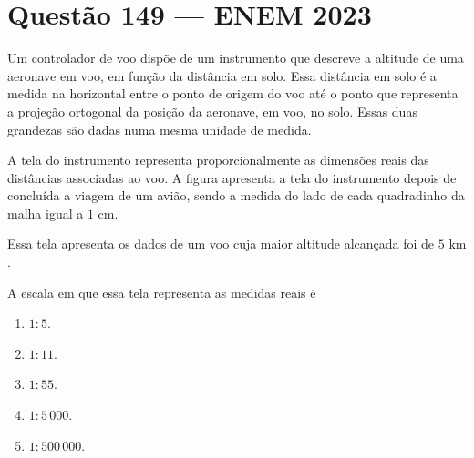 \documentclass[11pt,a4paper]{article}
\begin{document}
\section*{Questão 149 --- ENEM 2023}

Um controlador de voo dispõe de um instrumento que descreve a altitude de uma aeronave em voo, em função da distância em solo. Essa distância em solo é a medida na horizontal entre o ponto de origem do voo até o ponto que representa a projeção ortogonal da posição da aeronave, em voo, no solo. Essas duas grandezas são dadas numa mesma unidade de medida.

A tela do instrumento representa proporcionalmente as dimensões reais das distâncias associadas ao voo. A figura apresenta a tela do instrumento depois de concluída a viagem de um avião, sendo a medida do lado de cada quadradinho da malha igual a $1\text{ cm}$.

\begin{center}
\end{center}

Essa tela apresenta os dados de um voo cuja maior altitude alcançada foi de $5\text{ km}$.

A escala em que essa tela representa as medidas reais é

\begin{enumerate}[label=(\Alph*)]
    \item $1 : 5$.
    \item $1 : 11$.
    \item $1 : 55$.
    \item $1 : 5\,000$.
    \item $1 : 500\,000$.
\end{enumerate}
\end{document}
